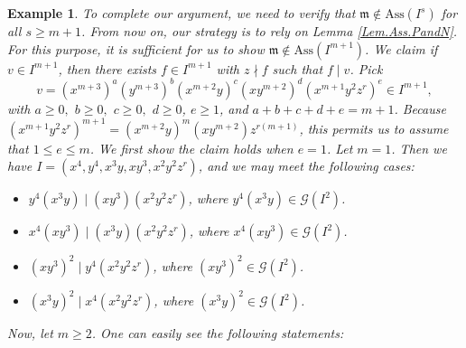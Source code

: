 \documentclass[11pt]{amsart}
\newtheorem{example}[theorem]{Example}
\begin{document}
\begin{example}
{To complete our argument, we need to verify that $\mathfrak{m} \notin \mathrm{Ass}(I^s)$  for all $s\geq m+1$. From now on, our strategy is to rely on  
Lemma \ref{Lem.Ass.PandN}. For this purpose, it is sufficient for us  to show $\mathfrak{m} \notin \mathrm{Ass}(I^{m+1})$. 
We claim  if $v\in I^{m+1}$, then there exists  $f\in I^{m+1}$ with  $z \nmid f$ such that $f\mid v$.  Pick 
\begin{equation}
v=(x^{m+3})^a (y^{m+3})^b (x^{m+2}y)^c (xy^{m+2})^d (x^{m+1}y^2z^r)^e \in I^{m+1}, \tag{$\star$}
\end{equation}
  with $a\geq 0,$ $b\geq 0,$  $c\geq 0,$ 
$d \geq0$, $e\geq 1$, and $a+b+c+d+e=m+1$. Because  $(x^{m+1}y^2z^r)^{m+1}=(x^{m+2}y)^m (xy^{m+2})z^{r(m+1)}$, 
this permits us to assume that  $1\leq e \leq m$.  We first show  the claim holds when $e=1$. Let $m=1$. 
 Then   we have $I=(x^4, y^4, x^3y, xy^3, x^2y^2z^r)$, and we may meet  the following cases:
  \begin{itemize}
\item[$\bullet$] $y^4(x^3y) \mid (xy^3)(x^2y^2z^r)$, where $y^4(x^3y)\in \mathcal{G}(I^2)$.
\item[$\bullet$]  $x^4(xy^3) \mid  (x^3y)(x^2y^2z^r)$, where $x^4(xy^3) \in \mathcal{G}(I^2)$.
\item[$\bullet$]  $(xy^3)^2 \mid y^4(x^2y^2z^r)$, where $(xy^3)^2 \in \mathcal{G}(I^2)$.
\item[$\bullet$]   $(x^3y)^2 \mid x^4(x^2y^2z^r)$, where $(x^3y)^2\in \mathcal{G}(I^2)$.
\end{itemize}
 Now, let $m\geq 2$.   One can easily see the following statements:

}
\end{example}
\end{document}
